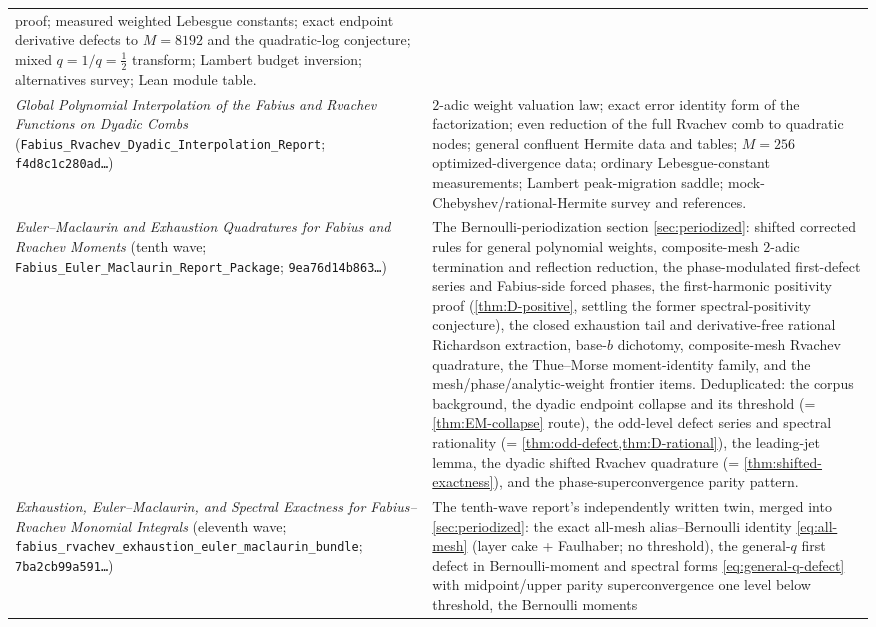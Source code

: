 \documentclass[11pt,oneside]{article}
\numberwithin{equation}{section}
\theoremstyle{definition}
\theoremstyle{remark}
\begin{document}
\begin{center}
\begin{tabular}{@{}p{}p{}@{}}
proof; measured weighted Lebesgue constants; exact endpoint
derivative defects to $M=8192$ and the quadratic-log conjecture;
mixed $q{=}1/q{=}\tfrac12$ transform; Lambert budget inversion;
alternatives survey; Lean module table. \\
\addlinespace
\emph{Global Polynomial Interpolation of the Fabius and Rvachev
Functions on Dyadic Combs}
(\nolinkurl{Fabius_Rvachev_Dyadic_Interpolation_Report};
\texttt{f4d8c1c280ad\ldots})
& $2$-adic weight valuation law; exact error identity form of the
factorization; even reduction of the full Rvachev comb to quadratic
nodes; general confluent Hermite data and tables; $M=256$
optimized-divergence data; ordinary Lebesgue-constant measurements;
Lambert peak-migration saddle; mock-Chebyshev/rational-Hermite
survey and references. \\
\addlinespace
\emph{Euler--Maclaurin and Exhaustion Quadratures for Fabius and
Rvachev Moments} (tenth wave;
\nolinkurl{Fabius_Euler_Maclaurin_Report_Package};
\texttt{9ea76d14b863\ldots})
& The Bernoulli-periodization section \cref{sec:periodized}: shifted
corrected rules for general polynomial weights, composite-mesh
$2$-adic termination and reflection reduction, the phase-modulated
first-defect series and Fabius-side forced phases, the first-harmonic
positivity proof (\cref{thm:D-positive}, settling the former
spectral-positivity conjecture), the closed exhaustion tail and
derivative-free rational Richardson extraction, base-$b$ dichotomy,
composite-mesh Rvachev quadrature, the Thue--Morse moment-identity
family, and the mesh/phase/analytic-weight frontier items.
Deduplicated: the corpus background, the dyadic endpoint collapse and
its threshold (= \cref{thm:EM-collapse} route), the odd-level defect
series and spectral rationality
(= \cref{thm:odd-defect,thm:D-rational}), the leading-jet lemma, the
dyadic shifted Rvachev quadrature (= \cref{thm:shifted-exactness}),
and the phase-superconvergence parity pattern. \\
\addlinespace
\emph{Exhaustion, Euler--Maclaurin, and Spectral Exactness for
Fabius--Rvachev Monomial Integrals} (eleventh wave;
\nolinkurl{fabius_rvachev_exhaustion_euler_maclaurin_bundle};
\texttt{7ba2cb99a591\ldots})
& The tenth-wave report's independently written twin, merged into
\cref{sec:periodized}: the exact all-mesh alias--Bernoulli identity
\eqref{eq:all-mesh} (layer cake + Faulhaber; no threshold), the
general-$q$ first defect in Bernoulli-moment and spectral forms
\eqref{eq:general-q-defect} with midpoint/upper parity
superconvergence one level below threshold, the Bernoulli moments

\end{tabular}
\end{center}
\end{document}

